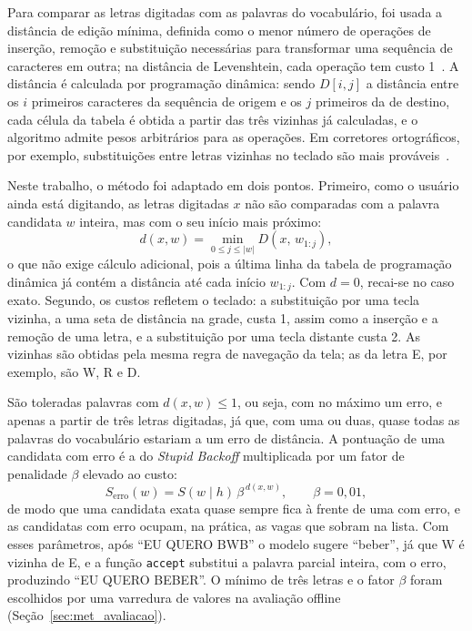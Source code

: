 Para comparar as letras digitadas com as palavras do vocabulário, foi usada a distância de edição mínima, definida como o menor número de operações de inserção, remoção e substituição necessárias para transformar uma sequência de caracteres em outra; na distância de Levenshtein, cada operação tem custo 1~\cite[cap.~2]{jurafsky2026slp}. A distância é calculada por programação dinâmica: sendo $D[i,j]$ a distância entre os $i$ primeiros caracteres da sequência de origem e os $j$ primeiros da de destino, cada célula da tabela é obtida a partir das três vizinhas já calculadas, e o algoritmo admite pesos arbitrários para as operações. Em corretores ortográficos, por exemplo, substituições entre letras vizinhas no teclado são mais prováveis~\cite[cap.~2]{jurafsky2026slp}.

Neste trabalho, o método foi adaptado em dois pontos. Primeiro, como o usuário ainda está digitando, as letras digitadas $x$ não são comparadas com a palavra candidata $w$ inteira, mas com o seu início mais próximo:
\begin{equation}
    d(x, w) = \min_{0 \le j \le |w|} D(x,\, w_{1:j}),
    \label{eq:distancia_prefixo}
\end{equation}
o que não exige cálculo adicional, pois a última linha da tabela de programação dinâmica já contém a distância até cada início $w_{1:j}$. Com $d = 0$, recai-se no caso exato. Segundo, os custos refletem o teclado: a substituição por uma tecla vizinha, a uma seta de distância na grade, custa 1, assim como a inserção e a remoção de uma letra, e a substituição por uma tecla distante custa 2. As vizinhas são obtidas pela mesma regra de navegação da tela; as da letra E, por exemplo, são W, R e D.

São toleradas palavras com $d(x, w) \le 1$, ou seja, com no máximo um erro, e apenas a partir de três letras digitadas, já que, com uma ou duas, quase todas as palavras do vocabulário estariam a um erro de distância. A pontuação de uma candidata com erro é a do \textit{Stupid Backoff} multiplicada por um fator de penalidade $\beta$ elevado ao custo:
\begin{equation}
    S_{\textrm{erro}}(w) = S(w \mid h)\,\beta^{\,d(x, w)}, \qquad \beta = 0{,}01,
    \label{eq:penalidade}
\end{equation}
de modo que uma candidata exata quase sempre fica à frente de uma com erro, e as candidatas com erro ocupam, na prática, as vagas que sobram na lista. Com esses parâmetros, após ``EU QUERO BWB'' o modelo sugere ``beber'', já que W é vizinha de E, e a função \texttt{accept} substitui a palavra parcial inteira, com o erro, produzindo ``EU QUERO BEBER''. O mínimo de três letras e o fator $\beta$ foram escolhidos por uma varredura de valores na avaliação offline (Seção~\ref{sec:met_avaliacao}).

